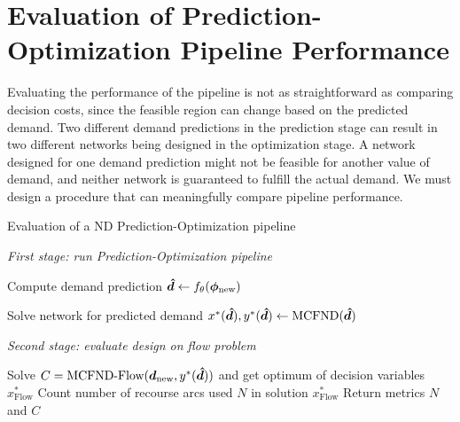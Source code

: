 
\section{Evaluation of Prediction-Optimization Pipeline Performance} \label{sec:methodology:pipeline-eval}

Evaluating the performance of the pipeline is not as straightforward as comparing decision costs, since the feasible region can change based on the predicted demand. Two different demand predictions in the prediction stage can result in two different networks being designed in the optimization stage. A network designed for one demand prediction might not be feasible for another value of demand, and neither network is guaranteed to fulfill the actual demand. We must design a procedure that can meaningfully compare pipeline performance.

\begin{algorithm}
    \caption{Evaluation of a ND Prediction-Optimization pipeline}\label{alg:methodology:pipeline-evaluation}
    \DontPrintSemicolon
    
    \KwOut{}
    
    \BlankLine

    \textit{First stage: run Prediction-Optimization pipeline}

    \nl Compute demand prediction ${\bm{\hat{d}}} \gets f_\theta({\bm{\phi}}_{\text{new}})$\;
    
    \nl Solve network for predicted demand $x^*({\bm{\hat{d}}}), y^*({\bm{\hat{d}}}) \gets \mathrm{MCFND}({\bm{\hat{d}}})$ \;

    \BlankLine

    \textit{Second stage: evaluate design on flow problem}

    \nl Solve $C = \text{MCFND-Flow}({\bm{d}}_{\text{new}}, y^*({\bm{\hat{d}}}))$ and get optimum of decision variables $x^*_\text{Flow}$\;
    \nl Count number of recourse arcs used $N$ in solution $x^*_\text{Flow}$\;
    \BlankLine
    \nl Return metrics $N$ and $C$\;
    
\end{algorithm}

